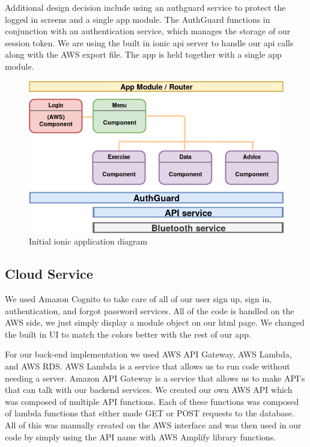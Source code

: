 \documentclass[a4paper,10pt]{article}
\begin{document}
            Additional design decision include using an authguard service to protect the logged in screens and a single app module. The AuthGuard functions in conjunction with an authentication service, which manages the storage of our session token. We are using the built in ionic api server to handle our api calls along with the AWS export file. The app is held together with a single app module.
            
            \begin{figure}[H]
            \centering
            \includegraphics[width=140mm, scale=1]{IonicDiagramFinal}
            \caption{Initial ionic application diagram}
            \end{figure}
        \subsection{Cloud Service}
	We used Amazon Cognito to take care of all of our user sign up, sign in, authentication, and forgot password services. All of the code is handled on the AWS side, we just simply display a module object on our html page. We changed the built in UI to match the colors better with the rest of our app. 

	For our back-end implementation we used AWS API Gateway, AWS Lambda, and AWS RDS. AWS Lambda is a service that allows us to run code without needing a server. Amazon API Gateway is a service that allows us to make API's that can talk with our backend services. We created our own AWS API which was composed of multiple API functions. Each of these functions was composed of lambda functions that either made GET or POST requests to the database. All of this was manually created on the AWS interface and was then used in our code by simply using the API name with AWS Amplify library functions. 
\end{document}
